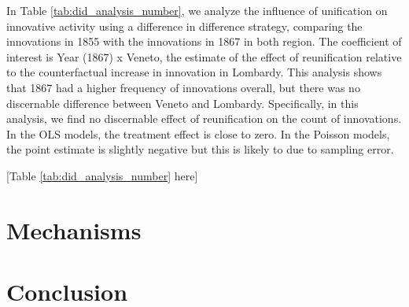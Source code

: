 In Table \ref{tab:did_analysis_number}, we analyze the influence of unification on innovative activity using a difference in difference strategy, comparing the innovations in 1855 with the innovations in 1867 in both region. The coefficient of interest is Year (1867) x Veneto, the estimate of the effect of reunification relative to the counterfactual increase in innovation in Lombardy. This analysis shows that 1867 had a higher frequency of innovations overall, but there was no discernable difference between Veneto and Lombardy. Specifically, in this analysis, we find no discernable effect of reunification on the count of innovations. In the OLS models, the treatment effect is close to zero. In the Poisson models, the point estimate is slightly negative but this is likely to due to sampling error. 

\begin{center}
    [Table \ref{tab:did_analysis_number} here]
\end{center}

\section{Mechanisms}







\section{Conclusion}




\clearpage

\appendix

